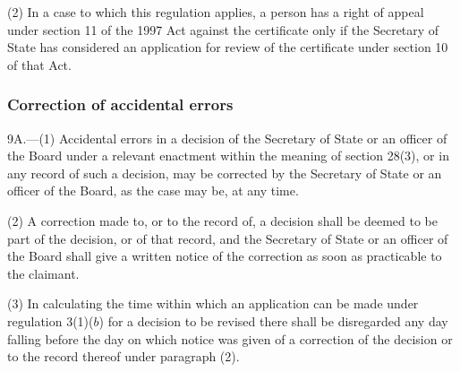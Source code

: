 \documentclass[12pt,a4paper]{article}
\begin{document}
(2) In a case to which this regulation applies, a person has a right of appeal under section 11 of the 1997 Act against the certificate only if the Secretary of State has considered an application for review of the certificate under section 10 of that Act.


\subsubsection[9A. Correction of accidental errors]{Correction of accidental errors}

9A.---(1)  Accidental errors in a decision of the Secretary of State or an officer of the Board under a relevant enactment within the meaning of section 28(3), or in any record of such a decision, may be corrected by the Secretary of State or an officer of the Board, as the case may be, at any time.

(2) A correction made to, or to the record of, a decision shall be deemed to be part of the decision, or of that record, and the Secretary of State or an officer of the Board shall give a written notice of the correction as soon as practicable to the claimant.

(3) In calculating the time within which an application can be made under regulation 3(1)($b$)  for a decision to be revised
there shall be disregarded any day falling before the day on which notice was given of a correction of the decision or to the record thereof under paragraph (2).


%
\end{document}

